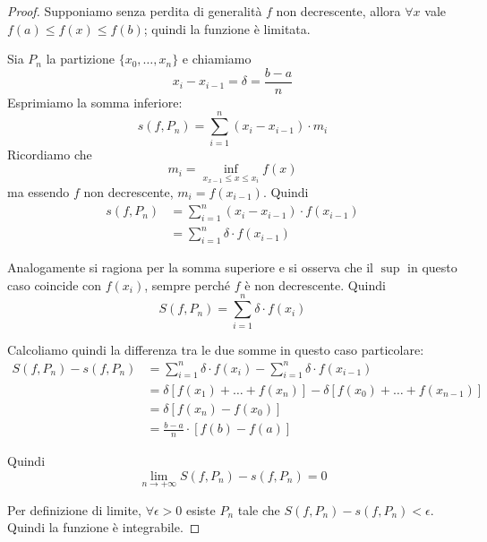 \begin{proof}
Supponiamo senza perdita di generalità $f$ non decrescente, allora $\forall x$ vale $f(a) \le f(x) \le f(b)$; quindi la funzione è limitata.

Sia $P_n$ la partizione $\{x_0, \ldots, x_n\}$ e chiamiamo 
\begin{equation*}
x_i - x_{i-1} = \delta = \frac{b-a}{n}
\end{equation*}
Esprimiamo la somma inferiore:
\begin{equation*}
s(f,P_n) = \sum_{i=1}^n (x_i - x_{i-1}) \cdot m_i
\end{equation*}
Ricordiamo che
\begin{equation*}
m_i = \inf_{x_{x-1}\le x \le x_i} f(x)
\end{equation*}
ma essendo $f$ non decrescente, $m_i = f(x_{i-1})$. Quindi
\begin{align*}
s(f,P_n) &= \sum_{i=1}^n (x_i - x_{i-1}) \cdot f(x_{i-1}) \\
&= \sum_{i=1}^n \delta \cdot f(x_{i-1})
\end{align*}

Analogamente si ragiona per la somma superiore e si osserva che il $\sup$ in questo caso coincide con $f(x_i)$, sempre perché $f$ è non decrescente. Quindi
\begin{equation*}
S(f,P_n) = \sum_{i=1}^n \delta \cdot f(x_i)
\end{equation*}

Calcoliamo quindi la differenza tra le due somme in questo caso particolare:
\begin{align*}
S(f,P_n) - s(f,P_n) &= \sum_{i=1}^n \delta \cdot f(x_i) - \sum_{i=1}^n \delta \cdot f(x_{i-1}) \\
&= \delta [f(x_1) + \ldots + f(x_n)] - \delta[f(x_0) + \ldots + f(x_{n-1})] \\
&= \delta [f(x_n) - f(x_0)] \\
&= \frac{b-a}{n} \cdot [f(b)-f(a)]
\end{align*}

Quindi
\begin{equation*}
\lim_{n \to +\infty} S(f,P_n) - s(f,P_n) = 0
\end{equation*}

Per definizione di limite, $\forall \epsilon > 0$ esiste $P_n$ tale che $S(f,P_n) - s(f,P_n) < \epsilon$. Quindi la funzione è integrabile.
\end{proof}

